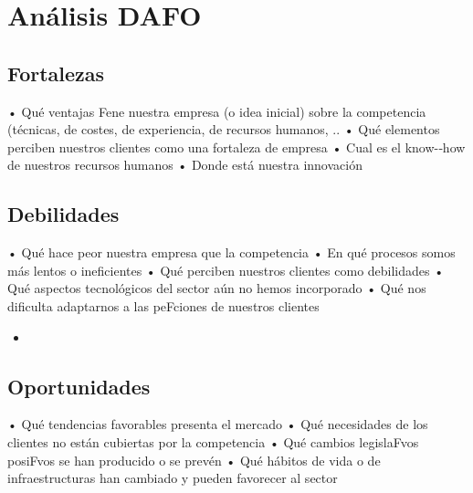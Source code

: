 \section{Análisis DAFO}  

\subsection{Fortalezas}
• Qué ventajas Fene nuestra empresa (o idea inicial) sobre la competencia (técnicas, de costes, de experiencia, de recursos humanos, .. 
• Qué elementos perciben nuestros clientes como una fortaleza de empresa 
• Cual es el know-­‐how de nuestros recursos humanos 
• Donde está nuestra innovación 

\begin{itemize}
\end{itemize}

\subsection{Debilidades}
• Qué hace peor nuestra empresa que la competencia 
• En qué procesos somos más lentos o ineficientes 
• Qué perciben nuestros clientes como debilidades 
• Qué aspectos tecnológicos del sector aún no hemos incorporado 
• Qué nos dificulta adaptarnos a las peFciones de nuestros clientes 

\begin{itemize}
    \item 
\end{itemize}

\subsection{Oportunidades}
• Qué tendencias favorables presenta el mercado 
• Qué necesidades de los clientes no están cubiertas por la competencia 
• Qué cambios legislaFvos posiFvos se han producido o se prevén 
• Qué hábitos de vida o de infraestructuras han cambiado y pueden favorecer al sector 

\begin{itemize}
\end{itemize}

